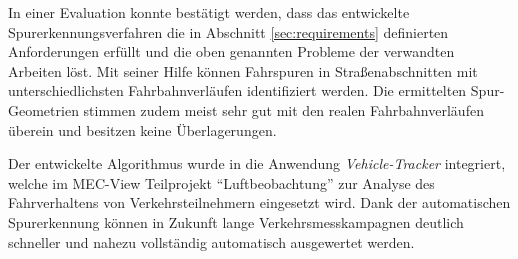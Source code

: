 In einer Evaluation konnte bestätigt werden, dass das entwickelte Spurerkennungsverfahren die in Abschnitt
\ref{sec:requirements} definierten Anforderungen erfüllt und die oben genannten Probleme der verwandten Arbeiten löst.
Mit seiner Hilfe können Fahrspuren in Straßenabschnitten mit unterschiedlichsten Fahrbahnverläufen identifiziert werden.
Die ermittelten Spur-Geometrien stimmen zudem meist sehr gut mit den realen Fahrbahnverläufen überein
und besitzen keine Überlagerungen.

Der entwickelte Algorithmus wurde in die Anwendung \textit{Vehicle-Tracker} integriert,
welche im MEC-View Teilprojekt ``Luftbeobachtung'' zur Analyse des Fahrverhaltens von Verkehrsteilnehmern
eingesetzt wird. Dank der automatischen Spurerkennung können in Zukunft lange Verkehrsmesskampagnen deutlich
schneller und nahezu vollständig automatisch ausgewertet werden.





